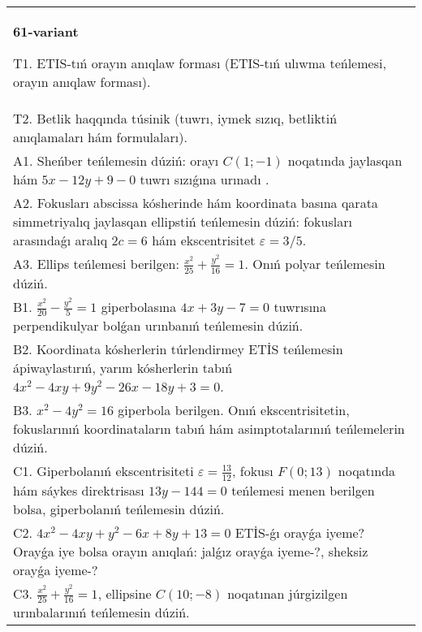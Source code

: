 \documentclass{article}
\begin{document}
\begin{tabular}{m{17cm}}
\textbf{61-variant}
\newline

T1. ETIS-tıń orayın anıqlaw forması (ETIS-tıń ulıwma teńlemesi, orayın anıqlaw forması).\\

T2. Betlik haqqında túsinik (tuwrı, iymek sızıq, betliktiń anıqlamaları hám formulaları).\\

A1. Sheńber teńlemesin dúziń: orayı $C (1;-1) $ noqatında jaylasqan hám $5 x-12 y+9 -0$ tuwrı sızıǵına urınadı .\\

A2. Fokusları abscissa kósherinde hám koordinata basına qarata simmetriyalıq jaylasqan ellipstiń teńlemesin dúziń: fokusları arasındaǵı aralıq $2 c=6$ hám ekscentrisitet $\varepsilon=3/5$.\\

A3. Ellips teńlemesi berilgen: $\frac{x^2}{25}+\frac{y^2}{16}=1$. Onıń polyar teńlemesin dúziń.\\

B1. $\frac{x^{2}}{20} - \frac{y^{2}}{5} = 1$ giperbolasına $4x + 3y - 7 = 0$ tuwrısına perpendikulyar bolǵan urınbanıń teńlemesin dúziń.  \\

B2. Koordinata kósherlerin túrlendirmey ETİS teńlemesin ápiwaylastırıń, yarım kósherlerin tabıń $4x^{2} - 4xy + 9y^{2} - 26x - 18y + 3 = 0$.\\

B3. $x^{2} - 4y^{2} = 16$ giperbola berilgen. Onıń ekscentrisitetin, fokuslarınıń koordinataların tabıń hám asimptotalarınıń teńlemelerin dúziń.\\

C1. Giperbolanıń ekscentrisiteti $\varepsilon = \frac{13}{12}$, fokusı $F(0;13)$ noqatında hám sáykes direktrisası $13y - 144 = 0$ teńlemesi menen berilgen bolsa, giperbolanıń teńlemesin dúziń.  \\

C2. $4x^{2} - 4xy + y^{2} - 6x + 8y + 13 = 0$ ETİS-ǵı orayǵa iyeme? Orayǵa iye bolsa orayın anıqlań: jalǵız orayǵa iyeme-?, sheksiz orayǵa iyeme-?  \\

C3. $\frac{x^{2}}{25} + \frac{y^{2}}{16} = 1$, ellipsine $C(10; - 8)$ noqatınan júrgizilgen urınbalarınıń teńlemesin dúziń.  \\

\end{tabular}
\vspace{1cm}
\end{document}
